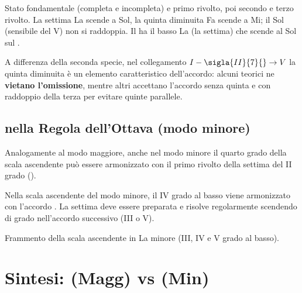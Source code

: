 \begin{esempio}
	\label{ex:ii7_stati_minore}
	Stato fondamentale (completa e incompleta) e primo rivolto, poi secondo e terzo rivolto. La settima La scende a Sol\diesis{}, la quinta diminuita Fa scende a Mi; il Sol\diesis{} (sensibile del V) non si raddoppia. Il  ha il basso La (la settima) che scende al Sol\diesis{} sul .
\end{esempio}

\begin{osservazione}
	\label{oss:omissione_quinta}
	A differenza della seconda specie, nel collegamento $I - \sigla{II}{7}{} \rightarrow V$ la quinta diminuita è un elemento caratteristico dell'accordo: alcuni teorici ne \textbf{vietano l'omissione}, mentre altri accettano l'accordo senza quinta e con raddoppio della terza per evitare quinte parallele.
\end{osservazione}

\subsection{ nella Regola dell'Ottava (modo minore)}
\label{subsec:ii7_regola_minore}

Analogamente al modo maggiore, anche nel modo minore il quarto grado della scala ascendente può essere armonizzato con il primo rivolto della settima del II grado ().

\begin{regola}
	\label{reg:ii65_regola_minore}
	Nella scala ascendente del modo minore, il IV grado al basso viene armonizzato con l'accordo . La settima deve essere preparata e risolve regolarmente scendendo di grado nell'accordo successivo (III o V).
\end{regola}

\begin{esempio}
	\label{ex:ii65_regola_minore}
	Frammento della scala ascendente in La minore (III, IV e V grado al basso).
\end{esempio}

\section{Sintesi:  (Magg) vs  (Min)}
\label{sec:sintesi_vii_ii}

